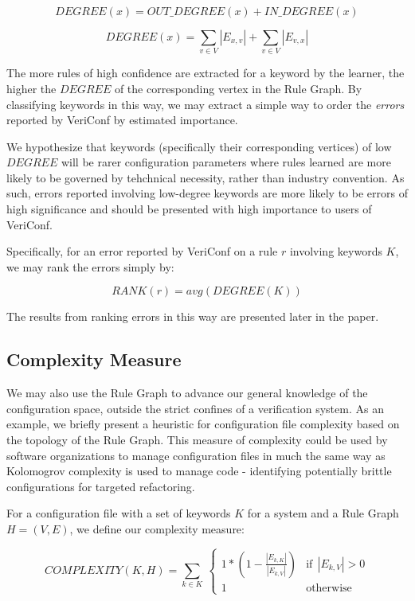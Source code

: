     $$DEGREE(x) = OUT\_DEGREE(x) + IN\_DEGREE(x)$$

    $$DEGREE(x) = \sum_{v \in V} |E_{x, v}| + \sum_{v \in V} |E_{v, x}|$$


The more rules of high confidence are extracted for a keyword by the learner, 
the higher the $DEGREE$ of the corresponding vertex in the Rule Graph.
By classifying keywords in this way, we may extract a simple way to
order the {\it errors} reported by VeriConf by estimated importance.

We hypothesize that keywords (specifically their corresponding vertices)
of low $DEGREE$ will be rarer configuration
parameters where rules learned are more likely to be governed by 
tehchnical necessity, rather than industry convention. As such, errors
reported involving low-degree keywords are more likely to be errors
of high significance and should be presented with high importance
to users of VeriConf.

Specifically, for an error reported by VeriConf on a rule $r$ involving
keywords $K$, we may rank the errors simply by:

    $$RANK(r) = avg( DEGREE(K) )$$

The results from ranking errors in this way are presented later in
the paper.

\subsection{Complexity Measure}

We may also use the Rule Graph to advance our general knowledge
of the configuration space, outside the strict confines of a
verification system. As an example, we briefly present a heuristic
for configuration file complexity based on the topology of the
Rule Graph. This measure of complexity could be used by software
organizations to manage configuration files in much the same way
as Kolomogrov complexity is used to manage code - identifying
potentially brittle configurations for targeted refactoring.


For a configuration file with a set of keywords $K$ for a system
and a Rule Graph $H = (V, E)$, we define our complexity measure:

\begin{equation}
    COMPLEXITY(K, H) = \sum_{k \in K} \
        \begin{cases}
            1 * (1 - \frac{|E_{k, K}|}{|E_{k, V}|}) & \text{if}\ \ |E_{k, V}| > 0 \\
            1 & \text{otherwise}
        \end{cases}
\end{equation}

